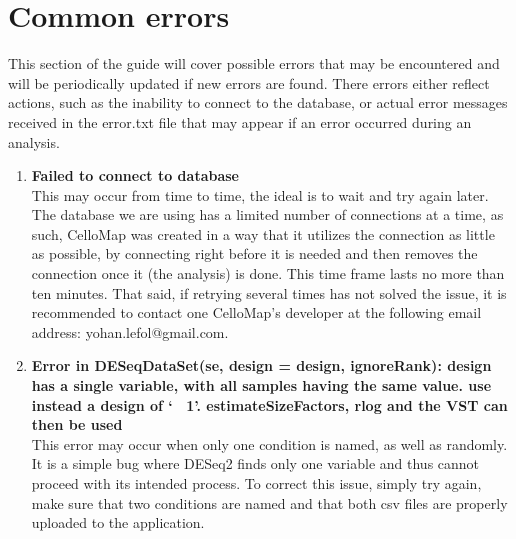 \documentclass[11pt]{article}
\begin{document}
\section{Common errors \label{common_err}}
This section of the guide will cover possible errors that may be encountered and will be periodically updated if new errors are found. There errors either reflect actions, such as the inability to connect to the database, or actual error messages received in the error.txt file that may appear if an error occurred during an analysis.
\begin{enumerate}
\item \textbf{Failed to connect to database}\\
This may occur from time to time, the ideal is to wait and try again later. The database we are using has a limited number of connections at a time, as such, CelloMap was created in a way that it utilizes the connection as little as possible, by connecting right before it is needed and then removes the connection once it (the analysis) is done. This time frame lasts no more than ten minutes.
That said, if retrying several times has not solved the issue, it is recommended to contact one CelloMap's developer at the following email address: yohan.lefol@gmail.com.

\item \textbf{Error in DESeqDataSet(se, design = design, ignoreRank): design has a single variable, with all samples having the same value. use instead a design of `~ 1'. estimateSizeFactors, rlog and the VST can then be used}\\
This error may occur when only one condition is named, as well as randomly. It is a simple bug where \acrshort{DESeq2} finds only one variable and thus cannot proceed with its intended process.
To correct this issue, simply try again, make sure that two conditions are named and that both \acrshort{csv} files are properly uploaded to the application.
  
\end{enumerate}


\printglossary[type=\acronymtype]



\end{document}
